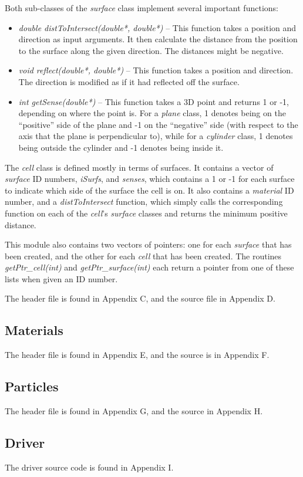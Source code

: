 Both sub-classes of the \textit{surface} class implement several important functions:

\begin{itemize}
\item \textit{double distToIntersect(double*, double*)} -- This function takes a position and direction as input arguments.  It then calculate the distance from the position to the surface along the given direction.  The distances might be negative.
\item \textit{void reflect(double*, double*)} -- This function takes a position and direction.  The direction is modified as if it had reflected off the surface.
\item \textit{int getSense(double*)} -- This function takes a 3D point and returns 1 or -1, depending on where the point is.  For a \textit{plane} class, 1 denotes being on the ``positive'' side of the plane and -1 on the ``negative'' side (with respect to the axis that the plane is perpendicular to), while for a \textit{cylinder} class, 1 denotes being outside the cylinder and -1 denotes being inside it.
\end{itemize}

The \textit{cell} class is defined mostly in terms of surfaces.  It contains a vector of \textit{surface} ID numbers, \textit{iSurfs}, and \textit{senses}, which contains a 1 or -1 for each surface to indicate which side of the surface the cell is on.  It also contains a \textit{material} ID number, and a \textit{distToIntersect} function, which simply calls the corresponding function on each of the \textit{cell}'s \textit{surface} classes and returns the minimum positive distance.

This module also contains two vectors of pointers: one for each \textit{surface} that has been created, and the other for each \textit{cell} that has been created.  The routines \textit{getPtr{\_}cell(int)} and \textit{getPtr{\_}surface(int)} each return a pointer from one of these lists when given an ID number.

The header file is found in Appendix C, and the source file in Appendix D.

\subsection{Materials}\label{ss:materials}

The header file is found in Appendix E, and the source is in Appendix F.

\subsection{Particles}\label{ss:particles}

The header file is found in Appendix G, and the source in Appendix H.

\subsection{Driver}\label{ss:driver}

The driver source code is found in Appendix I.


